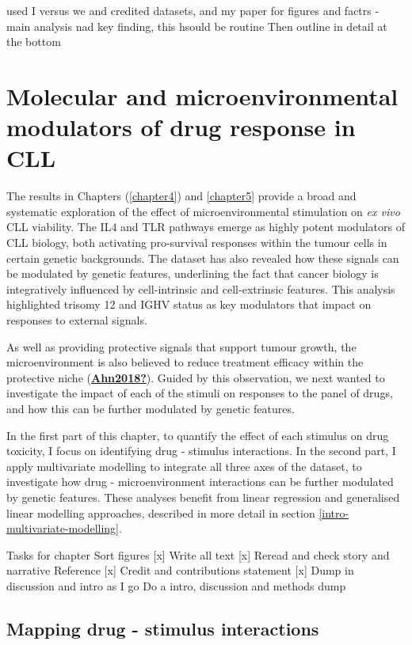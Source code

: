 \documentclass[11pt, a4paper, twosided]{book}
\begin{document}
used I versus we and credited datasets, and my paper for figures and factrs - main analysis nad key finding, this hsould be routine
Then outline in detail at the bottom

\hypertarget{chapter6}{%
\chapter{Molecular and microenvironmental modulators of drug response in CLL}\label{chapter6}}

The results in Chapters (\ref{chapter4}) and \ref{chapter5} provide a broad and systematic exploration of the effect of microenvironmental stimulation on \emph{ex vivo} CLL viability. The IL4 and TLR pathways emerge as highly potent modulators of CLL biology, both activating pro-survival responses within the tumour cells in certain genetic backgrounds. The dataset has also revealed how these signals can be modulated by genetic features, underlining the fact that cancer biology is integratively influenced by cell-intrinsic and cell-extrinsic features. This analysis highlighted trisomy 12 and IGHV status as key modulators that impact on responses to external signals.

As well as providing protective signals that support tumour growth, the microenvironment is also believed to reduce treatment efficacy within the protective niche (\protect\hyperlink{ref-Ahn2018}{\textbf{Ahn2018?}}). Guided by this observation, we next wanted to investigate the impact of each of the stimuli on responses to the panel of drugs, and how this can be further modulated by genetic features.

In the first part of this chapter, to quantify the effect of each stimulus on drug toxicity, I focus on identifying drug - stimulus interactions. In the second part, I apply multivariate modelling to integrate all three axes of the dataset, to investigate how drug - microenvironment interactions can be further modulated by genetic features. These analyses benefit from linear regression and generalised linear modelling approaches, described in more detail in section \ref{intro-multivariate-modelling}.

Tasks for chapter
Sort figures {[}x{]}
Write all text {[}x{]}
Reread and check story and narrative
Reference {[}x{]}
Credit and contributions statement {[}x{]}
Dump in discussion and intro as I go
Do a intro, discussion and methods dump

\hypertarget{mapping-interactions}{%
\section{Mapping drug - stimulus interactions}\label{mapping-interactions}}
\end{document}
